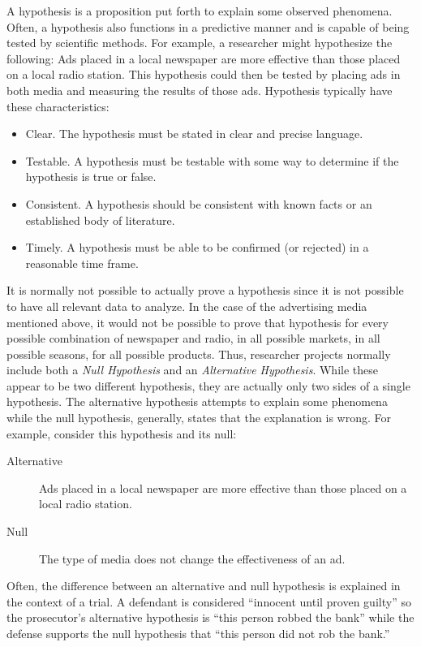 A hypothesis is a proposition put forth to explain some observed phenomena. Often, a hypothesis also functions in a predictive manner and is capable of being tested by scientific methods. For example, a researcher might hypothesize the following: Ads placed in a local newspaper are more effective than those placed on a local radio station. This hypothesis could then be tested by placing ads in both media and measuring the results of those ads. Hypothesis typically have these characteristics:

\begin{itemize}
	\item Clear. The hypothesis must be stated in clear and precise language.
	\item Testable. A hypothesis must be testable with some way to determine if the hypothesis is true or false.
	\item Consistent. A hypothesis should be consistent with known facts or an established body of literature.
	\item Timely. A hypothesis must be able to be confirmed (or rejected) in a reasonable time frame.
\end{itemize} 

It is normally not possible to actually prove a hypothesis since it is not possible to have all relevant data to analyze. In the case of the advertising media mentioned above, it would not be possible to prove that hypothesis for every possible combination of newspaper and radio, in all possible markets, in all possible seasons, for all possible products. Thus, researcher projects normally include both a \textit{Null Hypothesis} and an \textit{Alternative Hypothesis}. While these appear to be two different hypothesis, they are actually only two sides of a single hypothesis. The alternative hypothesis attempts to explain some phenomena while the null hypothesis, generally, states that the explanation is wrong. For example, consider this hypothesis and its null:

\begin{description}
	\item[Alternative] Ads placed in a local newspaper are more effective than those placed on a local radio station.
	\item[Null] The type of media does not change the effectiveness of an ad.
\end{description}

Often, the difference between an alternative and null hypothesis is explained in the context of a trial. A defendant is considered ``innocent until proven guilty'' so the prosecutor's alternative hypothesis is ``this person robbed the bank'' while the defense supports the null hypothesis that ``this person did not rob the bank.''

